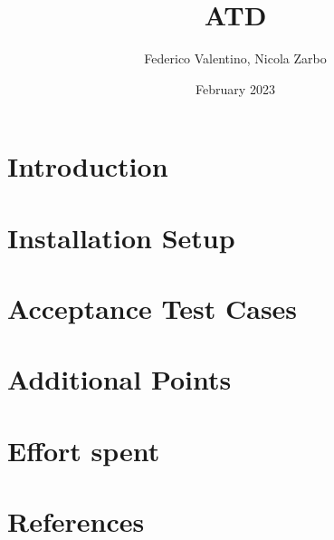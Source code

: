 \documentclass[oneside]{book}
\begin{document}
\title{ATD}
\author{Federico Valentino, Nicola Zarbo }
\date{February 2023}


\maketitle
\newpage
\setcounter{page}{1}

\tableofcontents %
\cleardoublepage

\chapter{Introduction}

\newpage

\chapter{Installation Setup}

\newpage

\chapter{Acceptance Test Cases}

\newpage

\chapter{Additional Points}

\newpage

\chapter{Effort spent}

\newpage

\chapter{References}

\newpage
\end{document}
